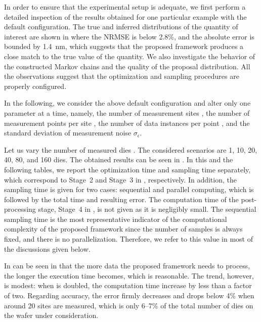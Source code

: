In order to ensure that the experimental setup is adequate, we first perform a
detailed inspection of the results obtained for one particular example with the
default configuration. The true and inferred distributions of the quantity of
interest are shown in  where the \ac{NRMSE} is below
2.8\%, and the absolute error is bounded by 1.4~nm, which suggests that the
proposed framework produces a close match to the true value of the quantity. We
also investigate the behavior of the constructed Markov chains and the quality
of the proposal distribution. All the observations suggest that the optimization
and sampling procedures are properly configured.

In the following, we consider the above default configuration and alter only one
parameter at a time, namely, the number of measurement sites \hnd, the number of
measurement points per site \np, the number of data instances per point \ns, and
the standard deviation of measurement noise $\sigma_\epsilon$.


Let us vary the number of measured dies \hnd. The considered scenarios are 1,
10, 20, 40, 80, and 160 dies. The obtained results can be seen in
. In this and the following tables, we report the
optimization time and sampling time separately, which correspond to Stage~2 and
Stage~3 in , respectively. In addition, the sampling
time is given for two cases: sequential and parallel computing, which is
followed by the total time and resulting error. The computation time of the
post-processing stage, Stage~4 in , is not given as it
is negligibly small. The sequential sampling time is the most representative
indicator of the computational complexity of the proposed framework since the
number of samples is always fixed, and there is no parallelization. Therefore,
we refer to this value in most of the discussions given below.

In can be seen in  that the more data the proposed
framework needs to process, the longer the execution time becomes, which is
reasonable. The trend, however, is modest: when \hnd is doubled, the computation
time increase by less than a factor of two. Regarding accuracy, the error firmly
decreases and drops below 4\% when around 20 sites are measured, which is only
6--7\% of the total number of dies on the wafer under consideration.

